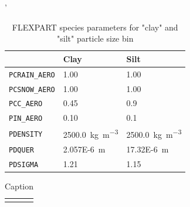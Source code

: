 \begin{table}[htpb]
\caption{FLEXPART species parameters for "clay" and "silt" particle size bin}
\label{tab:particle_params}'
\centering
\begin{tabular}{@{}lll@{}}
\toprule
 & Clay  & Silt \\ \midrule
\verb|PCRAIN_AERO| & 1.00  & 1.00 \\
\verb|PCSNOW_AERO| & 1.00  &  1.00 \\
\verb|PCC_AERO| & 0.45 \parencite{flexdust_ref_2016}   &  0.9\parencite{flexdust_ref_2016} \\
\verb|PIN_AERO| & 0.10 \parencite{flexdust_ref_2016} & 0.1 \parencite{flexdust_ref_2016} \\
\verb|PDENSITY| & \SI{2500.0}{\kg\per\cubic\metre}    & \SI{2500.0}{\kg\per\cubic\metre} \\
\verb|PDQUER| & \SI{2.057E-6}{\metre}    &  \SI{17.32E-6}{\metre}   \\
\verb|PDSIGMA| & 1.21   &  1.15    \\ \bottomrule
\end{tabular}%
\end{table}


\begin{table}[]
    \caption{Caption}
    \label{tab:my_label}
    \centering
    \begin{tabular}{@{}ll@{}} 
    \toprule
         &  \\ \midrule
         
         & 
    \end{tabular}

\end{table}